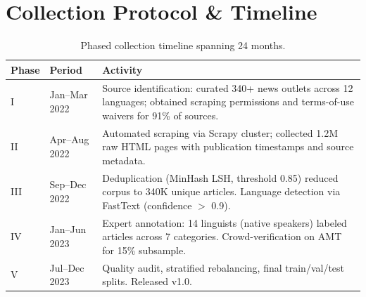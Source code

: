 \section{Collection Protocol \& Timeline}

\begin{table}[H]
\centering
\caption{Phased collection timeline spanning 24 months.}
\begin{tabular}{@{}llp{8.5cm}@{}}
  \toprule
  \textbf{Phase} & \textbf{Period} & \textbf{Activity} \\
  \midrule
  I   & Jan--Mar 2022 & Source identification: curated 340+ news outlets across 12 languages;
                        obtained scraping permissions and terms-of-use waivers for 91\% of sources. \\
  II  & Apr--Aug 2022 & Automated scraping via Scrapy cluster; collected 1.2M raw HTML pages with
                        publication timestamps and source metadata. \\
  III & Sep--Dec 2022 & Deduplication (MinHash LSH, threshold 0.85) reduced corpus to 340K unique
                        articles. Language detection via FastText (confidence $>$ 0.9). \\
  IV  & Jan--Jun 2023 & Expert annotation: 14 linguists (native speakers) labeled articles across
                        7 categories. Crowd-verification on AMT for 15\% subsample. \\
  V   & Jul--Dec 2023 & Quality audit, stratified rebalancing, final train/val/test splits.
                        Released v1.0. \\
  \bottomrule
\end{tabular}
\end{table}

